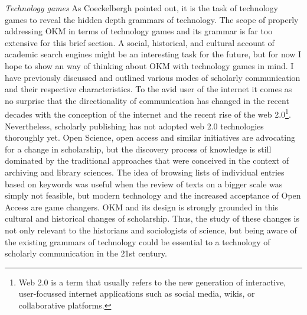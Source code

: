 \textit{Technology games} As Coeckelbergh pointed out, it is the task of technology games to reveal the hidden depth grammars of technology. The scope of properly addressing OKM in terms of technology games and its grammar is far too extensive for this brief section. A social, historical, and cultural account of academic search engines might be an interesting task for the future, but for now I hope to show an way of thinking about OKM with technology games in mind. I have previously discussed and outlined various modes of scholarly communication and their respective characteristics. To the avid user of the internet it comes as no surprise that the directionality of communication has changed in the recent decades with the conception of the internet and the recent rise of the web 2.0\footnote{Web 2.0 is a term that usually refers to the new generation of interactive, user-focussed internet applications such as social media, wikis, or collaborative platforms.}. Nevertheless, scholarly publishing has not adopted web 2.0 technologies thoroughly yet. Open Science, open access and similar initiatives are advocating for a change in scholarship, but the discovery process of knowledge is still dominated by the traditional approaches that were conceived in the context of archiving and library sciences. The idea of browsing lists of individual entries based on keywords was useful when the review of texts on a bigger scale was simply not feasible, but modern technology and the increased acceptance of Open Access are game changers. OKM and its design is strongly grounded in this cultural and historical changes of scholarship. Thus, the study of these changes is not only relevant to the historians and sociologists of science, but being aware of the existing grammars of technology could be essential to a technology of scholarly communication in the 21st century.
